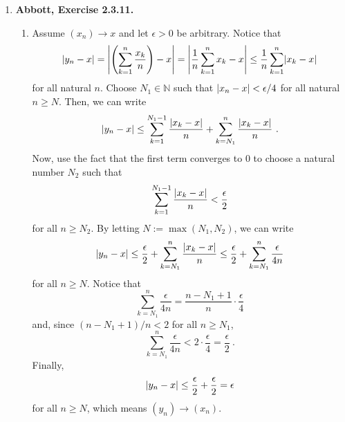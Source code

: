 \documentclass{article}
\DeclarePairedDelimiter\abs{\lvert}{\rvert}
\newcommand{\N}{\mathbb{N}}
\newcommand{\exc}[2][Abbott]{\item \textbf{#1, Exercise #2.}}
\let\oldmax\max
\renewcommand{\max}[1]{\oldmax \left( #1 \right)}
\begin{document}
\begin{enumerate}
	\exc{2.3.11}
	\begin{enumerate}
		\item Assume $(x_n) \rightarrow x$ and let $\epsilon > 0$ be arbitrary. Notice that \begin{equation*}
		      \abs*{y_n-x} = \abs*{\left (\sum\limits_{k=1}^{n} \frac{x_k}{n}\right)-x} = \abs*{\frac{1}{n} \sum\limits_{k=1}^{n} x_k-x} \leq \frac{1}{n} \sum\limits_{k=1}^n \abs*{x_k-x}
		\end{equation*} for all natural $n$. Choose $N_1 \in \N$ such that $\abs*{x_n-x} < \epsilon/4$ for all natural $n \geq N$. Then, we can write \begin{equation*}
		\abs*{y_n-x} \leq \sum\limits_{k=1}^{N_1-1} \frac{\abs*{x_k-x}}{n} + \sum\limits_{k=N_1}^{n} \frac{\abs*{x_k-x}}{n} ~ .
		\end{equation*} Now, use the fact that the first term converges to $0$ to choose a natural number $N_2$ such that \begin{equation*}
		\sum\limits_{k=1}^{N_1-1} \frac{\abs*{x_k-x}}{n} < \frac{\epsilon}{2}
		\end{equation*} for all $n \geq N_2$. By letting $N := \max{N_1, N_2}$, we can write \begin{equation*}
		\abs*{y_n-x} \leq \frac{\epsilon}{2} + \sum\limits_{k=N_1}^{n} \frac{\abs*{x_k-x}}{n} \leq \frac{\epsilon}{2} + \sum\limits_{k=N_1}^{n} \frac{\epsilon}{4n}
		\end{equation*} for all $n \geq N$. Notice that \begin{equation*}
		\sum\limits_{k=N_1}^{n} \frac{\epsilon}{4n} = \frac{n-N_1+1}{n} \cdot \frac{\epsilon}{4}
		\end{equation*} and, since $(n-N_1 + 1) / n < 2$ for all $n \geq N_1$, \begin{equation*}
		\sum\limits_{k=N_1}^{n} \frac{\epsilon}{4n} < 2 \cdot \frac{\epsilon}{4} = \frac{\epsilon}{2} ~.
		\end{equation*} Finally, \begin{equation*}
		\abs*{y_n-x} \leq \frac{\epsilon}{2} + \frac{\epsilon}{2} = \epsilon
		\end{equation*} for all $n \geq N$, which means $(y_n) \rightarrow (x_n)$.
							     

\end{enumerate}
\end{enumerate}
\end{document}
